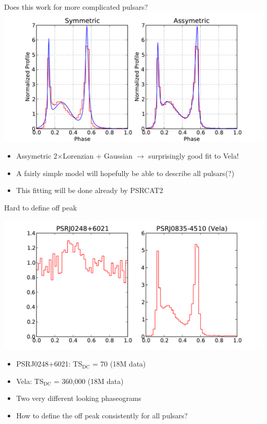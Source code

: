 \documentclass[12pt]{beamer}
\begin{document}
\begin{frame}{Does this work for more complicated pulsars?}
    \includegraphics[width=.85\textwidth]{plots/vela.pdf}
  \begin{itemize}
    \item Assymetric 2$\times$Lorenzian + Gaussian $\rightarrow$ surprisingly good fit
      to Vela!
    \item A fairly simple model will hopefully be able to describe all pulsars(?)
    \item This fitting will be done already by PSRCAT2
  \end{itemize}
\end{frame}


\begin{frame}{Hard to define off peak}

  \includegraphics[width=.85\textwidth]{plots/compare_faint_bright.pdf}

  \begin{itemize}
    \item PSRJ0248+6021: TS$_\text{DC}$ = 70 (18M data)
    \item Vela: TS$_\text{DC}$ = 360,000 (18M data) 
    \item Two very different looking phaseograms
    \item How to define the off peak consistently for all pulsars?
  \end{itemize}
\end{frame}
\end{document}
